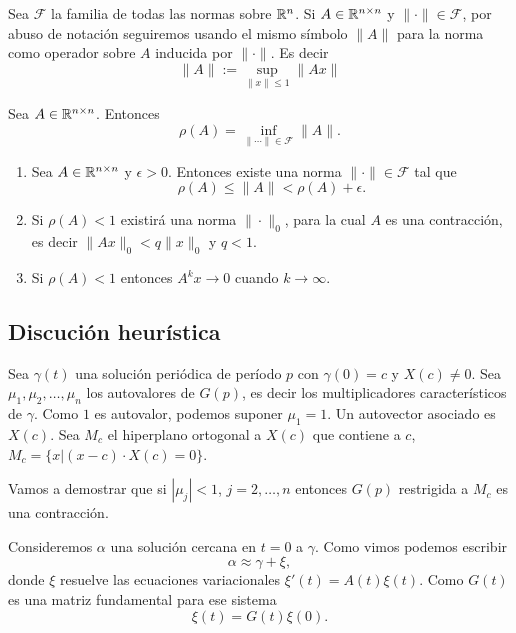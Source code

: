 Sea $\mathcal{F}$ la familia de todas las normas sobre $\mathbb{R}^n$. Si $A\in\mathbb{R}^{n\times n}$ y $\|\cdot \|\in\mathcal{F}$, 
por abuso de notación seguiremos usando el mismo símbolo $\|A\|$ para la norma como operador sobre $A$ inducida por 
$\|\cdot\|$. Es decir
\[\|A\|:=\sup_{\|x\|\leq 1} \|Ax\|\]


\begin{teorema}



  Sea $A\in\mathbb{R}^{n\times n}$. Entonces
\[  \rho(A)=\inf_{\|\cdots\|\in\mathcal{F}}\|A \|. \]

\end{teorema}

\begin{corolario}





\begin{enumerate}
 \item Sea $A\in\mathbb{R}^{n\times n}$ y $\epsilon>0$. Entonces existe una norma $\| \cdot\|\in\mathcal{F}$ tal que
\[  \rho(A)\leq \|A\|<\rho(A)+\epsilon.\]
\item Si $\rho(A)<1$ existirá una norma $\|\cdot\|_0$, para la cual $A$ es una contracción, es decir $\|Ax\|_0<q\|x\|_0$ y $q<1$. 

\item Si $\rho(A)<1$ entonces $A^kx\to 0$ cuando $k\to\infty$.
\end{enumerate}

\end{corolario}

 

\subsection{Discución heurística}
Sea $\gamma(t)$ una solución periódica de período $p$ con $\gamma(0)=c$ y $X(c)\neq 0$. Sea $\mu_1,\mu_2,\dots,\mu_n$ los autovalores de $G(p)$, 
es decir los
multiplicadores característicos de $\gamma$. Como $1$ es autovalor, podemos suponer $\mu_1=1$. Un autovector asociado es $X(c)$. Sea $M_c$ el hiperplano ortogonal a $X(c)$
que contiene a $c$, $M_c=\{x|(x-c)\cdot X(c)=0\}$. 

Vamos a demostrar  que si $|\mu_j|<1$, $j=2,\ldots,n$ entonces $G(p)$ restrigida a $M_c$ es una contracción.

Consideremos $\alpha$ una solución cercana en $t=0$ a $\gamma$. Como vimos podemos escribir 
\begin{equation}\label{ecuaaprox}
 \alpha\approx \gamma+\xi,
\end{equation}
 donde $\xi$ resuelve las ecuaciones 
variacionales $\xi'(t)=A(t)\xi(t)$. Como $G(t)$ es una matriz fundamental para ese sistema 
\begin{equation}\label{ecuavar}
 \xi(t)=G(t)\xi(0). 
\end{equation}






